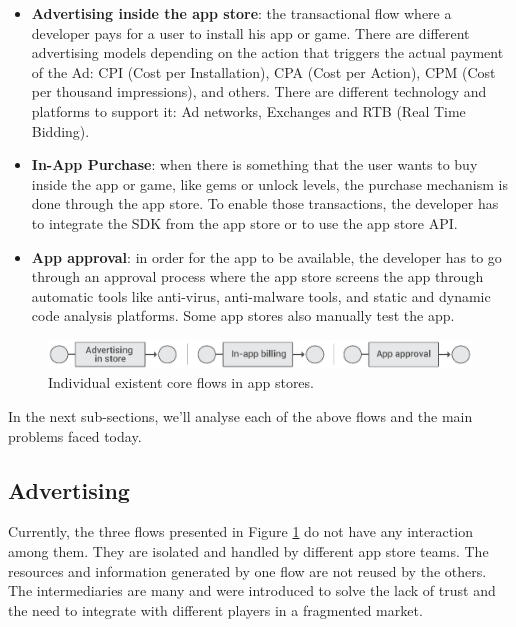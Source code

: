 \begin{itemize}
\item {\bf Advertising inside the app store}: the transactional flow where a developer pays for a user to install his app or game. There are different advertising models depending on the action that triggers the actual payment of the Ad: CPI (Cost per Installation), CPA (Cost per Action), CPM (Cost per thousand impressions), and others. There are different technology and platforms to support it: Ad networks, Exchanges and RTB (Real Time Bidding).
\item {\bf In-App Purchase}: when there is something that the user wants to buy inside the app or game, like gems or unlock levels, the purchase mechanism is done through the app store. To enable those transactions, the developer has to integrate the SDK from the app store or to use the app store API.
\item {\bf App approval}: in order for the app to be available, the developer has to go through an approval process where the app store screens the app through automatic tools like anti-virus, anti-malware tools, and static and dynamic code analysis platforms. Some app stores also manually test the app.
\end{itemize}


\begin{figure}[!ht]
\centering
\includegraphics[width=\textwidth]{diagrams/current_flows.eps}
\caption{Individual existent core flows in app stores.}
\label{fig:exist_flows}
\end{figure}




In the next sub-sections, we'll analyse each of the above flows and the main problems faced today.

\subsection{Advertising}


Currently, the three flows presented in Figure \ref{fig:exist_flows} do not have any interaction among them. They are isolated and handled by different app store teams. The resources and information generated by one flow are not reused by the others. The intermediaries are many and were introduced to solve the lack of trust and the need to integrate with different players in a fragmented market.  

